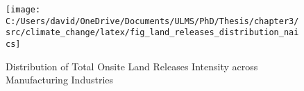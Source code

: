 \begin{figure}[H]
    \centering
    \texttt{[image: C:/Users/david/OneDrive/Documents/ULMS/PhD/Thesis/chapter3/src/climate\_change/latex/fig\_land\_releases\_distribution\_naics]}
    \caption{Distribution of Total Onsite Land Releases Intensity across Manufacturing Industries}
    \label{fig:land-releases-distribution-naics}
\end{figure}